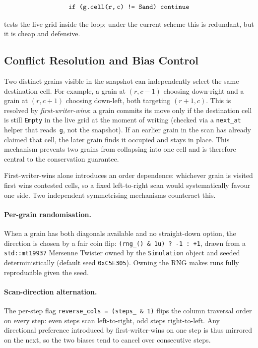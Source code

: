 \documentclass[oneside, a4paper, onecolumn, 11pt]{article}
\begin{document}
\[\texttt{if (g.cell(r,\,c) != Sand) continue} \]

tests the live grid inside the loop; under the current scheme this is redundant, but it is cheap and defensive.

\subsection{Conflict Resolution and Bias Control}
\label{sec:conflict}

Two distinct grains visible in the snapshot can independently select the same destination cell. For example, a grain at $(r,c{-}1)$ choosing down-right and a grain at $(r,c{+}1)$ choosing down-left, both targeting $(r{+}1,c)$.
This is resolved by \emph{first-writer-wins}: a grain commits its move only if the destination cell is still \texttt{Empty} in the live grid at the moment of writing (checked via a \texttt{next\_at} helper that reads~\texttt{g}, not the snapshot).
If an earlier grain in the scan has already claimed that cell, the later grain finds it occupied and stays in place.
This mechanism prevents two grains from collapsing into one cell and is therefore central to the conservation guarantee.

First-writer-wins alone introduces an order dependence: whichever grain is visited first wins contested cells, so a fixed left-to-right scan would systematically favour one side.
Two independent symmetrising mechanisms counteract this.

\paragraph{Per-grain randomisation.}
When a grain has both diagonals available and no straight-down option, the direction is chosen by a fair coin flip: \texttt{(rng\_() \& 1u) ? -1 : +1}, drawn from a \texttt{std::mt19937} Mersenne Twister owned by the \texttt{Simulation} object and seeded deterministically (default seed \texttt{0xC5E305}).
Owning the RNG makes runs fully reproducible given the seed.

\paragraph{Scan-direction alternation.}
The per-step flag \texttt{reverse\_cols = (steps\_ \& 1)} flips the column traversal order on every step: even steps scan left-to-right, odd steps right-to-left.
Any directional preference introduced by first-writer-wins on one step is thus mirrored on the next, so the two biases tend to cancel over consecutive steps.
\end{document}
